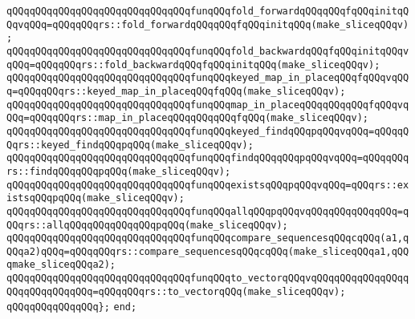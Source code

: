 \verb|qQQqqQQqqQQqqQQqqQQqqQQqqQQqqQQqfunqQQqfold_forwardqQQqqQQqfqQQqinitqQQqvqQQq=qQQqqQQqrs::fold_forwardqQQqqQQqfqQQqinitqQQq(make_sliceqQQqv);|\newline
\verb|qQQqqQQqqQQqqQQqqQQqqQQqqQQqqQQqfunqQQqfold_backwardqQQqfqQQqinitqQQqvqQQq=qQQqqQQqrs::fold_backwardqQQqfqQQqinitqQQq(make_sliceqQQqv);|\newline
\newline
\verb|qQQqqQQqqQQqqQQqqQQqqQQqqQQqqQQqfunqQQqkeyed_map_in_placeqQQqfqQQqvqQQq=qQQqqQQqrs::keyed_map_in_placeqQQqfqQQq(make_sliceqQQqv);|\newline
\verb|qQQqqQQqqQQqqQQqqQQqqQQqqQQqqQQqfunqQQqmap_in_placeqQQqqQQqqQQqfqQQqvqQQq=qQQqqQQqrs::map_in_placeqQQqqQQqqQQqfqQQq(make_sliceqQQqv);|\newline
\newline
\verb|qQQqqQQqqQQqqQQqqQQqqQQqqQQqqQQqfunqQQqkeyed_findqQQqpqQQqvqQQq=qQQqqQQqrs::keyed_findqQQqpqQQq(make_sliceqQQqv);|\newline
\verb|qQQqqQQqqQQqqQQqqQQqqQQqqQQqqQQqfunqQQqfindqQQqqQQqpqQQqvqQQq=qQQqqQQqrs::findqQQqqQQqpqQQq(make_sliceqQQqv);|\newline
\newline
\verb|qQQqqQQqqQQqqQQqqQQqqQQqqQQqqQQqfunqQQqexistsqQQqpqQQqvqQQq=qQQqrs::existsqQQqpqQQq(make_sliceqQQqv);|\newline
\verb|qQQqqQQqqQQqqQQqqQQqqQQqqQQqqQQqfunqQQqallqQQqpqQQqvqQQqqQQqqQQqqQQq=qQQqrs::allqQQqqQQqqQQqqQQqpqQQq(make_sliceqQQqv);|\newline
\newline
\verb|qQQqqQQqqQQqqQQqqQQqqQQqqQQqqQQqfunqQQqcompare_sequencesqQQqcqQQq(a1,qQQqa2)qQQq=qQQqqQQqrs::compare_sequencesqQQqcqQQq(make_sliceqQQqa1,qQQqmake_sliceqQQqa2);|\newline
\verb|qQQqqQQqqQQqqQQqqQQqqQQqqQQqqQQqfunqQQqto_vectorqQQqvqQQqqQQqqQQqqQQqqQQqqQQqqQQqqQQq=qQQqqQQqrs::to_vectorqQQq(make_sliceqQQqv);|\newline
\verb|qQQqqQQqqQQqqQQq};|\newline
\verb|end;|\newline
\newline

